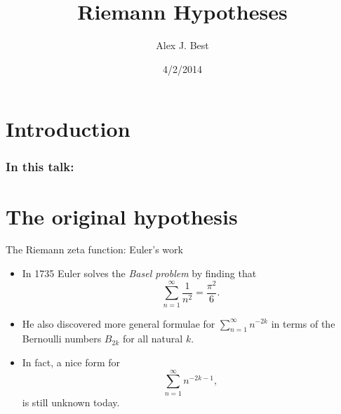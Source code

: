 \documentclass{beamer}
\author{Alex J. Best}
\institute{WMS Talks}
\date{4/2/2014}
\title{Riemann Hypotheses}
\begin{document}
\section{Introduction}

\frame{\titlepage}

\begin{frame}
\frametitle{In this talk:}
\tableofcontents
{} %
\end{frame}

\section{The original hypothesis}

\begin{frame}{The Riemann zeta function: Euler's work}
\begin{itemize}
\item In 1735 Euler solves the \emph{Basel problem} by finding that
\[\sum_{n=1}^{\infty} \frac{1}{n^2} = \frac{\pi^2}{6}.\]
\pause \item He also discovered more general formulae for $\sum_{n=1}^{\infty} n^{-2k}$ in terms of the Bernoulli numbers $B_{2k}$ for all natural $k$.
\pause \item In fact, a nice form for \[\sum_{n=1}^{\infty} n^{-2k-1},\] is still unknown today. %
\end{itemize}
\end{frame}
\end{document}
